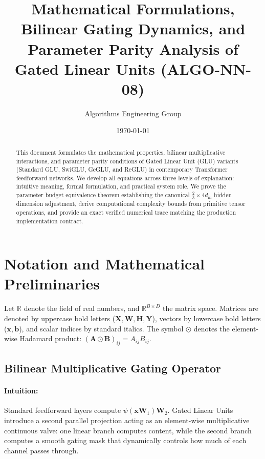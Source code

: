 \documentclass[11pt]{article}
\title{Mathematical Formulations, Bilinear Gating Dynamics, and Parameter Parity Analysis of Gated Linear Units (ALGO-NN-08)}
\author{Algorithms Engineering Group}
\date{\today}
\begin{document}
\maketitle

\begin{abstract}
This document formulates the mathematical properties, bilinear multiplicative interactions, and parameter parity conditions of Gated Linear Unit (GLU) variants (Standard GLU, SwiGLU, GeGLU, and ReGLU) in contemporary Transformer feedforward networks. We develop all equations across three levels of explanation: intuitive meaning, formal formulation, and practical system role. We prove the parameter budget equivalence theorem establishing the canonical $\frac{2}{3} \times 4 d_{\text{in}}$ hidden dimension adjustment, derive computational complexity bounds from primitive tensor operations, and provide an exact verified numerical trace matching the production implementation contract.
\end{abstract}

\section{Notation and Mathematical Preliminaries}
\label{sec:notation}

Let $\mathbb{R}$ denote the field of real numbers, and $\mathbb{R}^{B \times D}$ the matrix space. Matrices are denoted by uppercase bold letters ($\mathbf{X}, \mathbf{W}, \mathbf{H}, \mathbf{Y}$), vectors by lowercase bold letters ($\mathbf{x}, \mathbf{b}$), and scalar indices by standard italics. The symbol $\odot$ denotes the element-wise Hadamard product: $(\mathbf{A} \odot \mathbf{B})_{ij} = A_{ij} B_{ij}$.

\subsection{Bilinear Multiplicative Gating Operator}
\paragraph{Intuition:} Standard feedforward layers compute $\psi(\mathbf{x} \mathbf{W}_1) \mathbf{W}_2$. Gated Linear Units introduce a second parallel projection acting as an element-wise multiplicative continuous valve: one linear branch computes content, while the second branch computes a smooth gating mask that dynamically controls how much of each channel passes through.
\end{document}
